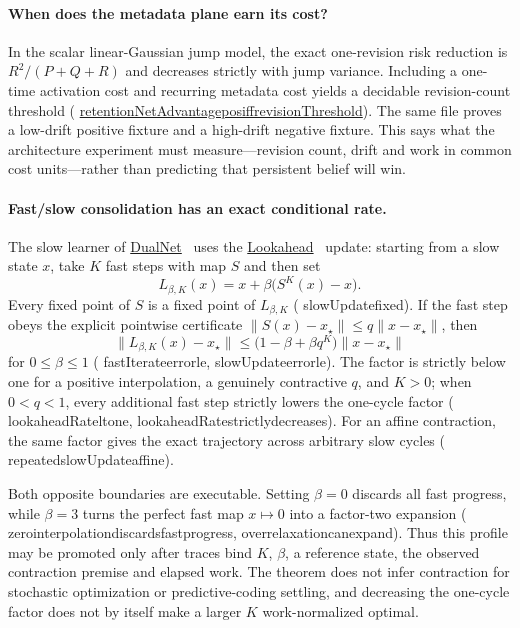 \documentclass[11pt]{article}
\newcommand{\leanname}[1]{{\scriptsize\ttfamily
  \def\_{\textunderscore\allowbreak}#1}}
\newcommand{\formalcommit}{f3a31db36bb2f944312ee31c1d86c2758109e83a}
\newcommand{\leansource}[3]{%
  \href{https://github.com/zariuq/MeTTapedia/blob/\formalcommit/#1\#L#2}{\leanname{#3}}}
\begin{document}
\paragraph{When does the metadata plane earn its cost?}
In the scalar linear-Gaussian jump model, the exact one-revision risk reduction is
$R^2/(P+Q+R)$ and decreases strictly with jump variance. Including a one-time activation
cost and recurring metadata cost yields a decidable revision-count threshold
(\leansource{lean/mettapedia/Mettapedia/MachineLearning/NeuralNetworks/UnifiedCarrier/RetentionEconomics.lean}{124-L143}{retentionNetAdvantage\_pos\_iff\_revisionThreshold}).
The same file proves a low-drift positive fixture and a high-drift negative fixture.
This says what the architecture experiment must measure---revision count, drift and work
in common cost units---rather than predicting that persistent belief will win.

\paragraph{Fast/slow consolidation has an exact conditional rate.}
The slow learner of
\href{https://arxiv.org/abs/2110.00175}{DualNet}~\cite{pham2021dualnet}
uses the
\href{https://arxiv.org/abs/1907.08610}{Lookahead}~\cite{zhang2019lookahead}
update: starting from a slow state $x$, take $K$ fast steps with map $S$ and
then set
\[
  L_{\beta,K}(x)=x+\beta\bigl(S^K(x)-x\bigr).
\]
Every fixed point of $S$ is a fixed point of $L_{\beta,K}$
(\leanname{slowUpdate\_fixed}). If the fast step obeys the explicit
pointwise certificate
$\lVert S(x)-x_\star\rVert\le q\lVert x-x_\star\rVert$, then
\[
 \lVert L_{\beta,K}(x)-x_\star\rVert
 \le \bigl(1-\beta+\beta q^K\bigr)\lVert x-x_\star\rVert
\]
for $0\le\beta\le1$
(\leanname{fastIterate\_error\_le},
\leanname{slowUpdate\_error\_le}). The factor is strictly below one for a
positive interpolation, a genuinely contractive $q$, and $K>0$; when
$0<q<1$, every additional fast step strictly lowers the one-cycle factor
(\leanname{lookaheadRate\_lt\_one},
\leanname{lookaheadRate\_strictly\_decreases}). For an affine contraction,
the same factor gives the exact trajectory across arbitrary slow cycles
(\leanname{repeated\_slowUpdate\_affine}).

Both opposite boundaries are executable. Setting $\beta=0$ discards all
fast progress, while $\beta=3$ turns the perfect fast map $x\mapsto0$ into
a factor-two expansion
(\leanname{zero\_interpolation\_discards\_fast\_progress},
\leanname{overrelaxation\_can\_expand}). Thus this profile may be promoted
only after traces bind $K$, $\beta$, a reference state, the observed
contraction premise and elapsed work. The theorem does not infer contraction
for stochastic optimization or predictive-coding settling, and decreasing
the one-cycle factor does not by itself make a larger $K$ work-normalized
optimal.
\end{document}

